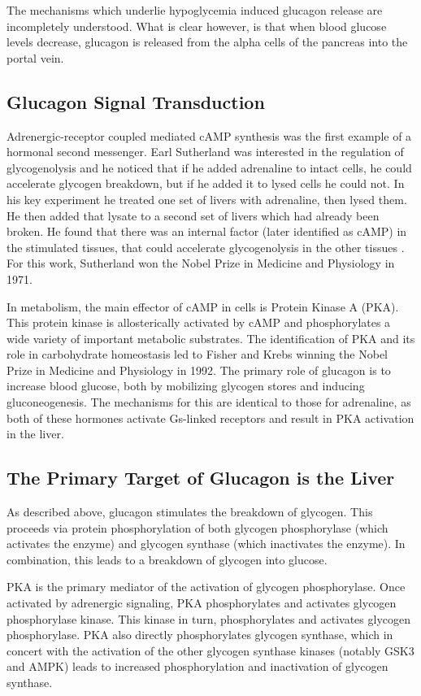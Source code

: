 \documentclass{tufte-handout}
\begin{document}
The mechanisms which underlie hypoglycemia induced glucagon release are incompletely understood.  What is clear however, is that when blood glucose levels decrease, glucagon is released from the alpha cells of the pancreas into the portal vein.

\subsection{Glucagon Signal Transduction}

Adrenergic-receptor coupled mediated cAMP synthesis was the first example of a hormonal second messenger.  Earl Sutherland was interested in the regulation of glycogenolysis and he noticed that if he added adrenaline to intact cells, he could accelerate glycogen breakdown, but if he added it to lysed cells he could not.  In his key experiment he treated one set of livers with adrenaline, then lysed them.  He then added that lysate to a second set of livers which had already been broken.  He found that there was an internal factor (later identified as cAMP) in the stimulated tissues, that could accelerate glycogenolysis in the other tissues \cite{Rall1956}.  For this work, Sutherland won the Nobel Prize in Medicine and Physiology in 1971.

In metabolism, the main effector of cAMP in cells is Protein Kinase A (PKA).  This protein kinase is allosterically activated by cAMP and phosphorylates a wide variety of important metabolic substrates.  The identification of PKA and its role in carbohydrate homeostasis led to Fisher and Krebs winning the Nobel Prize in Medicine and Physiology in 1992.  The primary role of glucagon is to increase blood glucose, both by mobilizing glycogen stores and inducing gluconeogenesis.  The mechanisms for this are identical to those for adrenaline, as both of these hormones activate Gs-linked receptors and result in PKA activation in the liver.

\subsection{The Primary Target of Glucagon is the Liver}

As described above, glucagon stimulates the breakdown of glycogen.  This proceeds via protein phosphorylation of both glycogen phosphorylase (which activates the enzyme) and glycogen synthase (which inactivates the enzyme).  In combination, this leads to a breakdown of glycogen into glucose.

PKA is the primary mediator of the activation of glycogen phosphorylase.  Once activated by adrenergic signaling, PKA phosphorylates and activates glycogen phosphorylase kinase.  This kinase in turn, phosphorylates and activates glycogen phosphorylase\cite{Krebs1956}.  PKA also directly phosphorylates glycogen synthase, which in concert with the activation of the other glycogen synthase kinases (notably GSK3 and AMPK) leads to increased phosphorylation and inactivation of glycogen synthase.
\end{document}
